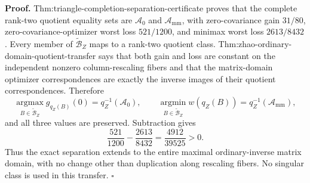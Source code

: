 \textbf{Proof.}
Thm:triangle-completion-separation-certificate proves that the complete rank-two quotient equality sets are \(\mathcal A_0\) and \(\mathcal A_{\mathrm{mm}}\), with zero-covariance gain \(31/80\), zero-covariance-optimizer worst loss \(521/1200\), and minimax worst loss \(2613/8432\).  Every member of \(\widetilde{\mathcal B}_Z\) maps to a rank-two quotient class.  Thm:zhao-ordinary-domain-quotient-transfer says that both gain and loss are constant on the independent nonzero column-rescaling fibers and that the matrix-domain optimizer correspondences are exactly the inverse images of their quotient correspondences.  Therefore
\[
\operatorname*{argmax}_{B\in\widetilde{\mathcal B}_Z}g_{q_Z(B)}(0)
=q_Z^{-1}(\mathcal A_0),
\qquad
\operatorname*{argmin}_{B\in\widetilde{\mathcal B}_Z}w(q_Z(B))
=q_Z^{-1}(\mathcal A_{\mathrm{mm}}),
\]
and all three values are preserved.  Subtraction gives
\[
\frac{521}{1200}-\frac{2613}{8432}
=\frac{4912}{39525}>0.
\]
Thus the exact separation extends to the entire maximal ordinary-inverse matrix domain, with no change other than duplication along rescaling fibers.  No singular class is used in this transfer. \(\square\)